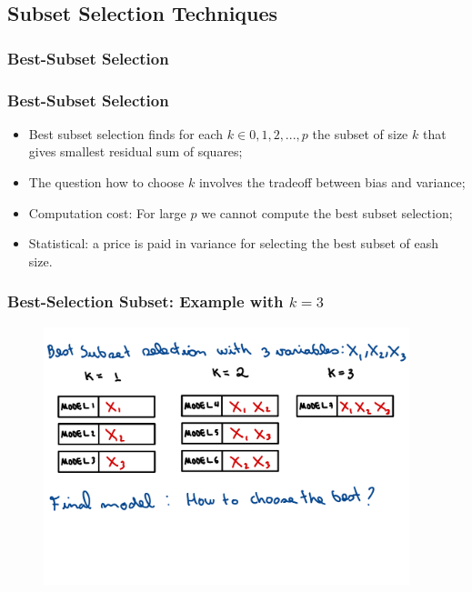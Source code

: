 \subsection {Subset Selection Techniques}


\subsubsection {Best-Subset Selection}
\begin{frame}
    \frametitle{Best-Subset Selection}

    \begin{itemize}

        \item Best subset selection finds for each $k\in{0,1,2,...,p}$ the subset of size $k$
        that gives smallest residual sum of squares;

        \item The question how to choose $k$ involves the tradeoff between bias and variance;

        \item Computation cost: For large $p$ we cannot compute the best subset selection;

        \item Statistical: a price is paid in variance for selecting the best subset of eash size.

    \end{itemize}
\end{frame}


\begin{frame}
    \frametitle{Best-Selection Subset: Example with $k=3$}
    \begin{figure}
        \centering
        \includegraphics[width=0.95\textwidth]{sections/strategies/figures/best_selection_example.pdf}
    \end{figure}
\end{frame}


